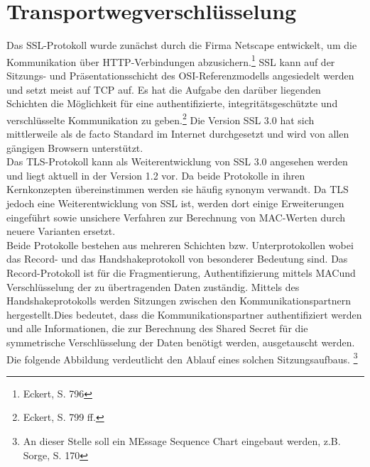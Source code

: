 \chapter{Transportwegverschlüsselung}
Das \ac{SSL}-Protokoll wurde zunächst durch die Firma Netscape entwickelt, um die Kommunikation über \ac{HTTP}-Verbindungen abzusichern.\footnote{Eckert, S. 796} \ac{SSL} kann auf der Sitzungs- und Präsentationsschicht des \ac{OSI}-Referenzmodells angesiedelt werden und setzt meist auf \ac{TCP} auf. Es hat die Aufgabe den darüber liegenden Schichten die Möglichkeit für eine authentifizierte, integritätsgeschützte und verschlüsselte Kommunikation zu geben.\footnote{Eckert, S. 799 ff.}
Die Version \ac{SSL} 3.0 hat sich mittlerweile als de facto Standard im Internet durchgesetzt und wird von allen gängigen Browsern unterstützt.\\
Das \ac{TLS}-Protokoll kann als Weiterentwicklung von \ac{SSL}  3.0 angesehen werden und liegt aktuell in der Version 1.2 vor. Da beide Protokolle in ihren Kernkonzepten übereinstimmen werden sie häufig synonym verwandt. Da \ac{TLS} jedoch eine Weiterentwicklung von \ac{SSL} ist, werden dort einige Erweiterungen eingeführt sowie unsichere Verfahren zur Berechnung von \ac{MAC}-Werten durch neuere Varianten ersetzt.\\
Beide Protokolle bestehen aus mehreren Schichten bzw. Unterprotokollen wobei das Record- und das Handshakeprotokoll von besonderer Bedeutung sind. Das Record-Protokoll ist für die Fragmentierung, Authentifizierung mittels \ac{MAC}und Verschlüsselung der zu übertragenden Daten zuständig. Mittels des Handshakeprotokolls werden Sitzungen zwischen den Kommunikationspartnern hergestellt.Dies bedeutet, dass die Kommunikationspartner authentifiziert werden und alle Informationen, die zur Berechnung des Shared Secret für die symmetrische Verschlüsselung der Daten benötigt werden, ausgetauscht werden. Die folgende Abbildung verdeutlicht den Ablauf eines solchen Sitzungsaufbaus. \footnote{An dieser Stelle soll ein MEssage Sequence Chart eingebaut werden, z.B. Sorge, S. 170}\\
	